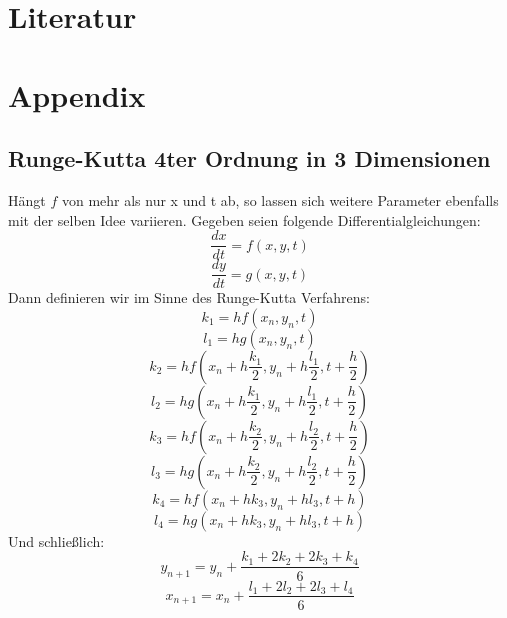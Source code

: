 \documentclass{scrartcl}
\begin{document}
\section{ Literatur }
\nocite{*}
\printbibliography

\section{Appendix}
\subsection {Runge-Kutta 4ter Ordnung in 3 Dimensionen}
Hängt $f$ von mehr als nur x und t ab, so lassen sich weitere Parameter ebenfalls mit der selben Idee variieren.
Gegeben seien folgende Differentialgleichungen:
$$\frac{dx}{dt}=f(x,y,t)$$
$$\frac{dy}{dt}=g(x,y,t)$$
Dann definieren wir im Sinne des Runge-Kutta Verfahrens:
$$k_1 = hf(x_n,y_n,t)$$
$$l_1 = hg(x_n,y_n,t)$$
$$k_2 = hf(x_n+h\frac{k_1}{2},y_n+h\frac{l_1}{2},t+\frac{h}{2})$$
$$l_2 = hg(x_n+h\frac{k_1}{2},y_n+h\frac{l_1}{2},t+\frac{h}{2})$$
$$k_3 = hf(x_n+h\frac{k_2}{2},y_n+h\frac{l_2}{2},t+\frac{h}{2})$$
$$l_3 = hg(x_n+h\frac{k_2}{2},y_n+h\frac{l_2}{2},t+\frac{h}{2})$$
$$k_4 = hf(x_n+hk_3,y_n+hl_3,t+h)$$
$$l_4 = hg(x_n+hk_3,y_n+hl_3,t+h)$$
Und schließlich:
$$y_{n+1} = y_n + \frac{k_1 + 2k_2 + 2k_3 + k_4}{6}$$
$$x_{n+1} = x_n + \frac{l_1 + 2l_2 + 2l_3 + l_4}{6}$$
\end{document}
